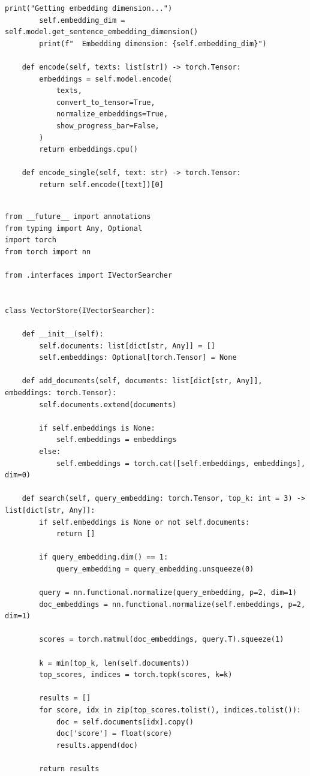 \begin{lstlisting}[basicstyle=\tiny\ttfamily,breaklines=true]
        print("Getting embedding dimension...")
        self.embedding_dim = self.model.get_sentence_embedding_dimension()
        print(f"  Embedding dimension: {self.embedding_dim}")

    def encode(self, texts: list[str]) -> torch.Tensor:
        embeddings = self.model.encode(
            texts,
            convert_to_tensor=True,
            normalize_embeddings=True,
            show_progress_bar=False,
        )
        return embeddings.cpu()

    def encode_single(self, text: str) -> torch.Tensor:
        return self.encode([text])[0]
\end{lstlisting}

\begin{lstlisting}[basicstyle=\tiny\ttfamily,breaklines=true]

from __future__ import annotations
from typing import Any, Optional
import torch
from torch import nn

from .interfaces import IVectorSearcher


class VectorStore(IVectorSearcher):

    def __init__(self):
        self.documents: list[dict[str, Any]] = []
        self.embeddings: Optional[torch.Tensor] = None

    def add_documents(self, documents: list[dict[str, Any]], embeddings: torch.Tensor):
        self.documents.extend(documents)

        if self.embeddings is None:
            self.embeddings = embeddings
        else:
            self.embeddings = torch.cat([self.embeddings, embeddings], dim=0)

    def search(self, query_embedding: torch.Tensor, top_k: int = 3) -> list[dict[str, Any]]:
        if self.embeddings is None or not self.documents:
            return []

        if query_embedding.dim() == 1:
            query_embedding = query_embedding.unsqueeze(0)

        query = nn.functional.normalize(query_embedding, p=2, dim=1)
        doc_embeddings = nn.functional.normalize(self.embeddings, p=2, dim=1)

        scores = torch.matmul(doc_embeddings, query.T).squeeze(1)

        k = min(top_k, len(self.documents))
        top_scores, indices = torch.topk(scores, k=k)

        results = []
        for score, idx in zip(top_scores.tolist(), indices.tolist()):
            doc = self.documents[idx].copy()
            doc['score'] = float(score)
            results.append(doc)

        return results
\end{lstlisting}

